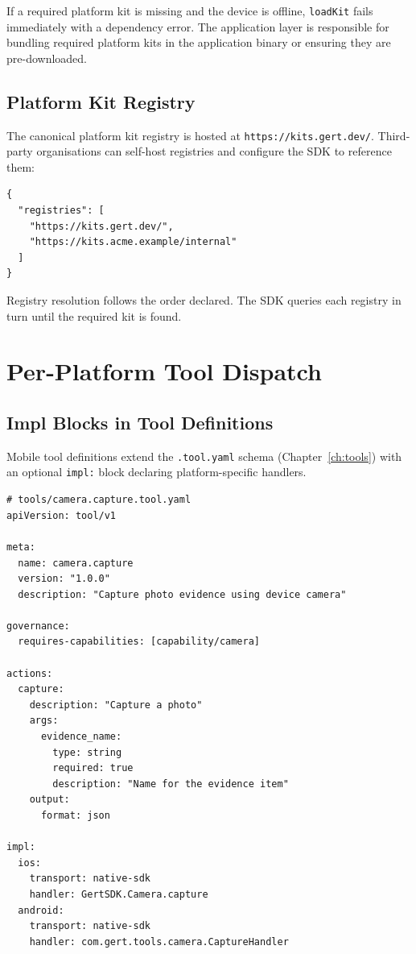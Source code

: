 If a required platform kit is missing and the device is offline, \texttt{loadKit} fails immediately with a dependency error. The application layer is responsible for bundling required platform kits in the application binary or ensuring they are pre-downloaded.

\subsection{Platform Kit Registry}

The canonical platform kit registry is hosted at \texttt{https://kits.gert.dev/}. Third-party organisations can self-host registries and configure the SDK to reference them:

\begin{verbatim}
{
  "registries": [
    "https://kits.gert.dev/",
    "https://kits.acme.example/internal"
  ]
}
\end{verbatim}

Registry resolution follows the order declared. The SDK queries each registry in turn until the required kit is found.

\section{Per-Platform Tool Dispatch}

\subsection{Impl Blocks in Tool Definitions}

Mobile tool definitions extend the \texttt{.tool.yaml} schema (Chapter~\ref{ch:tools}) with an optional \texttt{impl:} block declaring platform-specific handlers.

\begin{verbatim}
# tools/camera.capture.tool.yaml
apiVersion: tool/v1

meta:
  name: camera.capture
  version: "1.0.0"
  description: "Capture photo evidence using device camera"

governance:
  requires-capabilities: [capability/camera]

actions:
  capture:
    description: "Capture a photo"
    args:
      evidence_name:
        type: string
        required: true
        description: "Name for the evidence item"
    output:
      format: json

impl:
  ios:
    transport: native-sdk
    handler: GertSDK.Camera.capture
  android:
    transport: native-sdk
    handler: com.gert.tools.camera.CaptureHandler
\end{verbatim}

